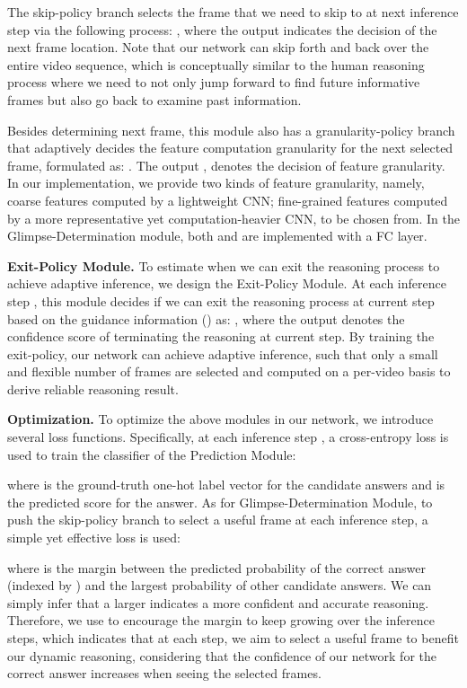 \documentclass[final]{cvpr}
\begin{document}
The skip-policy branch selects the frame that we need to skip to at next inference step via the following process: , where the output  indicates the decision of the next frame location. Note that our network can skip forth and back over the entire video sequence, which is conceptually similar to the human reasoning process where we need to not only jump forward to find future informative frames but also go back to examine past information. 


Besides determining next frame, this module also has a granularity-policy branch that adaptively decides the feature computation granularity for the next selected frame, formulated as:
. The output , 
denotes the decision of feature granularity. In our implementation, we provide two kinds of feature granularity, namely, coarse features computed by a lightweight CNN; fine-grained features computed by a more representative yet computation-heavier CNN, to be chosen from. In the Glimpse-Determination module, both  and  are implemented with a FC layer. 




{\bf Exit-Policy Module.} To estimate when we can exit the reasoning process to achieve adaptive inference, we design the Exit-Policy Module. At each inference step , this module decides if we can exit the reasoning process at current step based on the guidance information () as: , where the output  denotes
the confidence score of terminating the reasoning at current step. By training the exit-policy, 
our network can achieve adaptive inference, such that only a small and flexible number of frames are selected and computed on a per-video basis to derive reliable reasoning result.

{\bf Optimization.} To optimize the above modules in our network, we introduce several loss functions. Specifically, at each inference step , a cross-entropy loss  is used to train the classifier of the Prediction Module:

where  is the ground-truth one-hot label vector for the candidate answers and  is the predicted score for the  answer.
As for Glimpse-Determination Module, to push the skip-policy branch to select a useful frame at each inference step, a simple yet effective loss is used:

where  is the margin between the predicted probability of the correct answer (indexed by ) and the largest probability of other candidate answers. We can simply infer that a larger  indicates a more confident and accurate reasoning. Therefore, we use  to encourage the margin to keep growing over the inference steps, which indicates that at each step, we aim to select a useful frame to benefit our dynamic reasoning, considering that the confidence of our network for the correct answer increases when seeing the selected frames.
\end{document}
